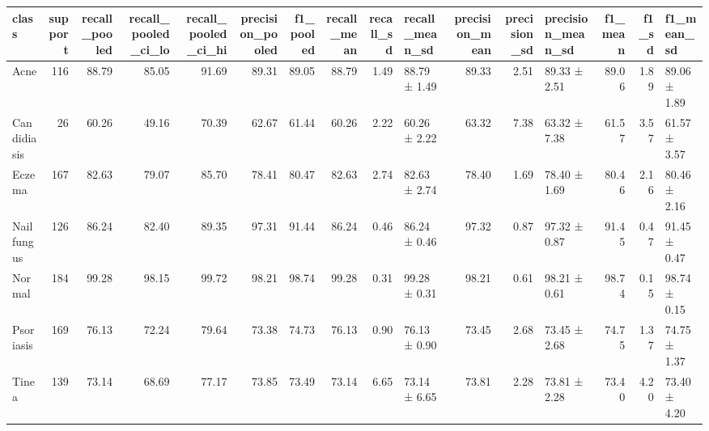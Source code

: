 \begin{tabular}{lrrrrrrrrlrrlrrl}
\toprule
class & support & recall\_pooled & recall\_pooled\_ci\_lo & recall\_pooled\_ci\_hi & precision\_pooled & f1\_pooled & recall\_mean & recall\_sd & recall\_mean\_sd & precision\_mean & precision\_sd & precision\_mean\_sd & f1\_mean & f1\_sd & f1\_mean\_sd \\
\midrule
Acne & 116 & 88.79 & 85.05 & 91.69 & 89.31 & 89.05 & 88.79 & 1.49 & 88.79 ± 1.49 & 89.33 & 2.51 & 89.33 ± 2.51 & 89.06 & 1.89 & 89.06 ± 1.89 \\
Candidiasis & 26 & 60.26 & 49.16 & 70.39 & 62.67 & 61.44 & 60.26 & 2.22 & 60.26 ± 2.22 & 63.32 & 7.38 & 63.32 ± 7.38 & 61.57 & 3.57 & 61.57 ± 3.57 \\
Eczema & 167 & 82.63 & 79.07 & 85.70 & 78.41 & 80.47 & 82.63 & 2.74 & 82.63 ± 2.74 & 78.40 & 1.69 & 78.40 ± 1.69 & 80.46 & 2.16 & 80.46 ± 2.16 \\
Nail fungus & 126 & 86.24 & 82.40 & 89.35 & 97.31 & 91.44 & 86.24 & 0.46 & 86.24 ± 0.46 & 97.32 & 0.87 & 97.32 ± 0.87 & 91.45 & 0.47 & 91.45 ± 0.47 \\
Normal & 184 & 99.28 & 98.15 & 99.72 & 98.21 & 98.74 & 99.28 & 0.31 & 99.28 ± 0.31 & 98.21 & 0.61 & 98.21 ± 0.61 & 98.74 & 0.15 & 98.74 ± 0.15 \\
Psoriasis & 169 & 76.13 & 72.24 & 79.64 & 73.38 & 74.73 & 76.13 & 0.90 & 76.13 ± 0.90 & 73.45 & 2.68 & 73.45 ± 2.68 & 74.75 & 1.37 & 74.75 ± 1.37 \\
Tinea & 139 & 73.14 & 68.69 & 77.17 & 73.85 & 73.49 & 73.14 & 6.65 & 73.14 ± 6.65 & 73.81 & 2.28 & 73.81 ± 2.28 & 73.40 & 4.20 & 73.40 ± 4.20 \\
\bottomrule
\end{tabular}
